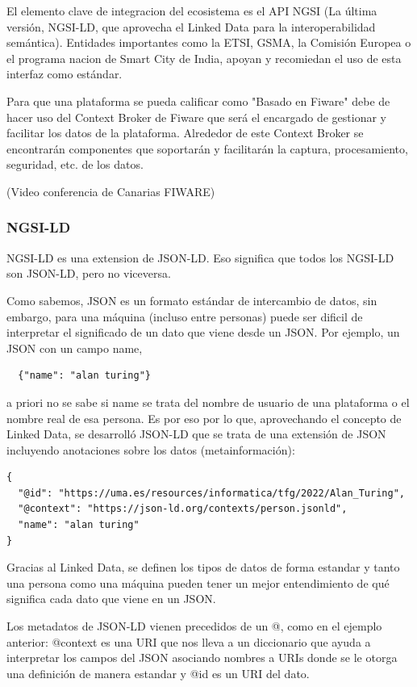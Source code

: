 \documentclass[12pt, a4paper, twoside]{article}
\begin{document}
El elemento clave de integracion del ecosistema es el API NGSI 
(La última versión, NGSI-LD, que aprovecha el Linked Data para la 
interoperabilidad semántica). Entidades importantes como
la ETSI, GSMA, la Comisión Europea o el programa nacion de 
Smart City de India, apoyan y recomiedan el uso de esta interfaz como estándar.

Para que una plataforma se pueda calificar como "Basado en Fiware" debe de hacer uso
del Context Broker de Fiware que será el encargado de gestionar y facilitar los datos
de la plataforma. Alrededor de este Context Broker se encontrarán componentes que 
soportarán y facilitarán la captura, procesamiento, seguridad, etc. de los datos.

(Video conferencia de Canarias FIWARE)

\subsubsection{NGSI-LD}
NGSI-LD es una extension de JSON-LD. Eso significa que todos los NGSI-LD son JSON-LD,
pero no viceversa.

Como sabemos, JSON es un formato estándar de intercambio de datos, sin embargo, para
una máquina (incluso entre personas) puede ser dificil de interpretar el significado
de un dato que viene desde un JSON. Por ejemplo, un JSON con un campo name,
\begin{lstlisting}
  {"name": "alan turing"}
\end{lstlisting}
a priori no se sabe si name se trata del nombre de usuario de una plataforma o el 
nombre real de esa persona. Es por eso por lo que, aprovechando el concepto de
Linked Data, se desarrolló JSON-LD que se trata de una 
extensión de JSON incluyendo anotaciones sobre los datos (metainformación):
\begin{lstlisting}
{
  "@id": "https://uma.es/resources/informatica/tfg/2022/Alan_Turing",
  "@context": "https://json-ld.org/contexts/person.jsonld",
  "name": "alan turing"
}
\end{lstlisting}
Gracias al Linked Data, se definen los tipos de datos de forma estandar y tanto una 
persona como una máquina pueden tener un mejor entendimiento de qué significa cada dato
que viene en un JSON.

Los metadatos de JSON-LD vienen precedidos de un @, como en el ejemplo anterior:
@context es una URI que nos lleva a un diccionario que ayuda a interpretar los campos
del JSON asociando nombres a URIs donde se le otorga una definición
de manera estandar y @id es un URI del dato.
\end{document}
